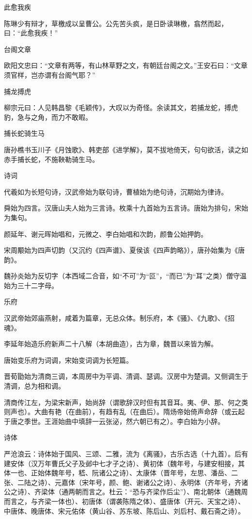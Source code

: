 \documentclass[a4paper,12pt,UTF8,twoside]{ctexbook}
\begin{document}
    此愈我疾
    
    陈琳少有辩才，草檄成以呈曹公。公先苦头疯，是日卧读琳檄，翕然而起，曰：“此愈我疾！”
    
    台阁文章
    
    欧阳文忠曰：“文章有两等，有山林草野之文，有朝廷台阁之文。”王安石曰：“文章须官样，岂亦谓有台阁气耶？”
    
    捕龙搏虎
    
    柳宗元曰：人见韩昌黎《毛颖传》，大叹以为奇怪。余读其文，若捕龙蛇，搏虎豹，急与之角，而力不敢暇。
    
    捕长蛇骑生马
    
    唐孙樵书玉川子《月蚀歌》、韩吏部《进学解》，莫不拔地倚天，句句欲活，读之如赤手捕长蛇，不施鞅勒骑生马。
    
    诗词
    
    代羲如为长短句诗，汉武帝始为联句诗，曹植始为绝句诗，沉期始为律诗。
    
    舜始为四言。汉唐山夫人始为三言诗。枚乘十九首始为五言诗。唐始为排句，宋始为集句。
    
    颜延年、谢元晖始唱和，元微之、李白始唱和次韵，颜鲁公始押韵。
    
    宋周颙始为四声切韵（又沉约《四声谱》、夏侯该《四声韵略》），唐孙始集为《唐韵》。
    
    魏孙炎始为反切字（本西域二合音，如“不可”为“叵”，“而已”为“耳”之类）僧守温始为三十二字母。
    
    乐府
    
    汉武帝始郊庙燕射，咸着为篇章，无总众体。制乐府，本《骚》、《九歌》、《招魂》。
    
    李延年始造乐府新声二十八解（本胡曲造），古为章，魏晋以来皆为解。
    
    唐始变乐府为词调，宋始变词调为长短篇。
    
    晋荀勖始为清商三调，本周房中为平调、清调、瑟调。汉房中为楚调。又侧调生于清调，总为相和调。
    
    清商传江左，为梁宋新声，始尚辞（谓歌辞汉时但有其音耳。夷、伊、那、何之类则声也）。大曲有艳（在曲前），有趋有乱（在曲后）。隋炀帝始倚声命辞（或云起于唐之季世。王涯始曲中填辞一云张泌，然六朝已有之）。李白始为小辞。
    
    诗体
    
    严沧浪云：诗体始于国风、三颂、二雅，流为《离骚》，古乐古选（十九首）。后有建安体（汉万年曹氏父子及邺中七才子之诗）、黄初体（魏年号，与建安相接，其体一也、正始体魏年号，嵇、阮诸公之诗）、太康体（晋年号，左思、潘岳、二张、二陆之诗）、元嘉体（宋年号，颜、鲍、谢诸公之诗）、永明体（齐年号，齐诸公之诗）、齐梁体（通两朝而言之。杜云：“恐与齐梁作后尘”）、南北朝体（通魏周而言之，与齐梁一体也）、初唐体（谓袭陈隋之体）、盛唐体（开元、天宝之诗）、中唐体、晚唐体、宋元佑体（黄山谷、苏东坡、陈后山、刘后村、戴石斋之诗）。
    
\end{document}
